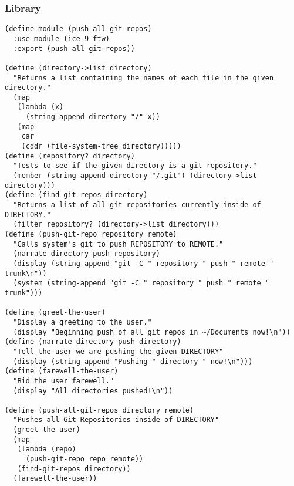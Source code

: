 \documentclass[11pt]{article}
\begin{document}
\subsubsection{Library}
\label{sec:org91bd70c}
\begin{verbatim}
(define-module (push-all-git-repos)
  :use-module (ice-9 ftw)
  :export (push-all-git-repos))

(define (directory->list directory)
  "Returns a list containing the names of each file in the given directory."
  (map
   (lambda (x)
     (string-append directory "/" x))
   (map
    car
    (cddr (file-system-tree directory)))))
(define (repository? directory)
  "Tests to see if the given directory is a git repository."
  (member (string-append directory "/.git") (directory->list directory)))
(define (find-git-repos directory)
  "Returns a list of all git repositories currently inside of DIRECTORY."
  (filter repository? (directory->list directory)))
(define (push-git-repo repository remote)
  "Calls system's git to push REPOSITORY to REMOTE."
  (narrate-directory-push repository)
  (display (string-append "git -C " repository " push " remote " trunk\n"))
  (system (string-append "git -C " repository " push " remote " trunk")))

(define (greet-the-user)
  "Display a greeting to the user."
  (display "Beginning push of all git repos in ~/Documents now!\n"))
(define (narrate-directory-push directory)
  "Tell the user we are pushing the given DIRECTORY"
  (display (string-append "Pushing " directory " now!\n")))
(define (farewell-the-user)
  "Bid the user farewell."
  (display "All directories pushed!\n"))

(define (push-all-git-repos directory remote)
  "Pushes all Git Repositories inside of DIRECTORY"
  (greet-the-user)
  (map
   (lambda (repo)
     (push-git-repo repo remote))
   (find-git-repos directory))
  (farewell-the-user))
\end{verbatim}
\end{document}
